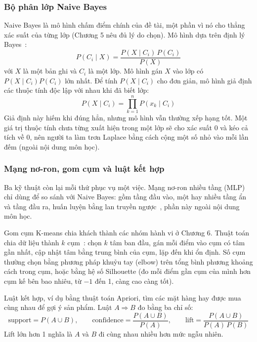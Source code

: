 \subsubsection{Bộ phân lớp Naive Bayes}
Naive Bayes là mô hình chấm điểm chính của đề tài, một phần vì nó cho thẳng xác suất của từng lớp (Chương 5 nêu đủ lý do chọn). Mô hình dựa trên định lý Bayes~\cite{han2011}:
\begin{equation}
    P(C_i \mid X) = \frac{P(X \mid C_i)\, P(C_i)}{P(X)}
\end{equation}
với $X$ là một bản ghi và $C_i$ là một lớp. Mô hình gán $X$ vào lớp có $P(X \mid C_i)P(C_i)$ lớn nhất. Để tính $P(X \mid C_i)$ cho đơn giản, mô hình giả định các thuộc tính độc lập với nhau khi đã biết lớp:
\begin{equation}
    P(X \mid C_i) = \prod_{k=1}^{n} P(x_k \mid C_i)
\end{equation}
Giả định này hiếm khi đúng hẳn, nhưng mô hình vẫn thường xếp hạng tốt. Một giá trị thuộc tính chưa từng xuất hiện trong một lớp sẽ cho xác suất 0 và kéo cả tích về 0, nên người ta làm trơn Laplace bằng cách cộng một số nhỏ vào mỗi lần đếm (ngoài nội dung môn học).

\subsubsection{Mạng nơ-ron, gom cụm và luật kết hợp}
Ba kỹ thuật còn lại mỗi thứ phục vụ một việc. Mạng nơ-ron nhiều tầng (MLP) chỉ dùng để so sánh với Naive Bayes: gồm tầng đầu vào, một hay nhiều tầng ẩn và tầng đầu ra, huấn luyện bằng lan truyền ngược~\cite{han2011}, phần này ngoài nội dung môn học.

Gom cụm K-means chia khách thành các nhóm hành vi ở Chương 6. Thuật toán chia dữ liệu thành $k$ cụm~\cite{han2011}: chọn $k$ tâm ban đầu, gán mỗi điểm vào cụm có tâm gần nhất, cập nhật tâm bằng trung bình của cụm, lặp đến khi ổn định. Số cụm thường chọn bằng phương pháp khuỷu tay (elbow) trên tổng bình phương khoảng cách trong cụm, hoặc bằng hệ số Silhouette (đo mỗi điểm gần cụm của mình hơn cụm kế bên bao nhiêu, từ $-1$ đến 1, càng cao càng tốt).

Luật kết hợp, ví dụ bằng thuật toán Apriori, tìm các mặt hàng hay được mua cùng nhau để gợi ý sản phẩm. Luật $A \Rightarrow B$ đo bằng ba chỉ số:
\begin{equation}
    \text{support} = P(A \cup B), \qquad
    \text{confidence} = \frac{P(A \cup B)}{P(A)}, \qquad
    \text{lift} = \frac{P(A \cup B)}{P(A)\,P(B)}
\end{equation}
Lift lớn hơn 1 nghĩa là $A$ và $B$ đi cùng nhau nhiều hơn mức ngẫu nhiên.

